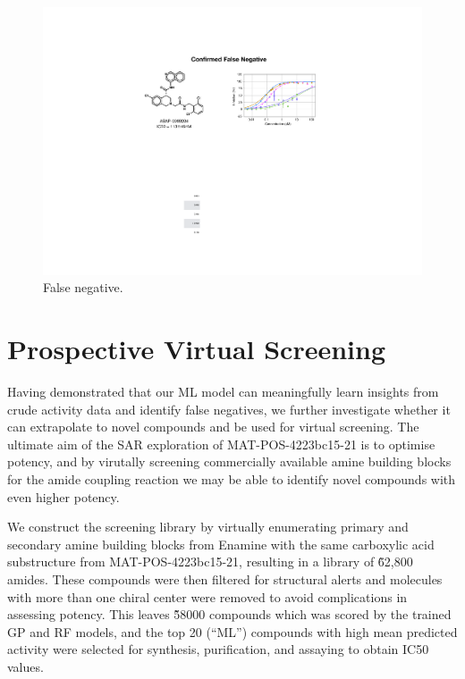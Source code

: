 
\begin{figure}
    \centering
    \includegraphics[width=\textwidth]{Chapters/Crude/Figs/false_negative.pdf}
    \caption{False negative.}
    \label{fig:false_negative}
\end{figure}

\section{Prospective Virtual Screening}

Having demonstrated that our ML model can meaningfully learn insights from crude activity data and identify false negatives, we further investigate whether it can extrapolate to novel compounds and be used for virtual screening. The ultimate aim of the SAR exploration of MAT-POS-4223bc15-21 is to optimise potency, and by virutally screening commercially available amine building blocks for the amide coupling reaction we may be able to identify novel compounds with even higher potency.

We construct the screening library by virtually enumerating primary and secondary amine building blocks from Enamine with the same carboxylic acid substructure from MAT-POS-4223bc15-21, resulting in a library of \~62,800 amides. These compounds were then filtered for structural alerts and molecules with more than one chiral center were removed to avoid complications in assessing potency. This leaves \~58000 compounds which was scored by the trained GP and RF models, and the top 20 (``ML'') compounds with high mean predicted activity were selected for synthesis, purification, and assaying to obtain IC50 values.

